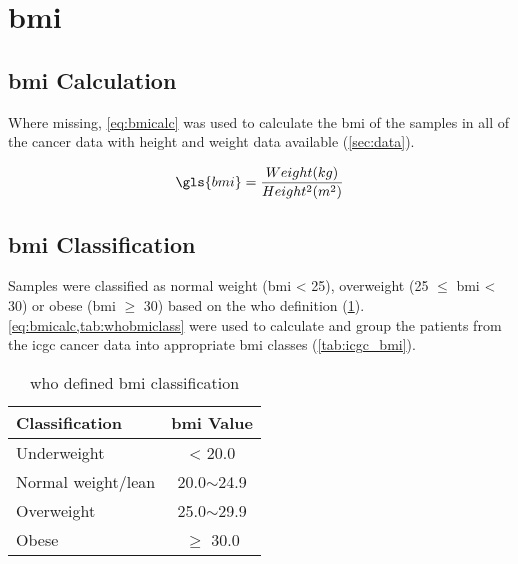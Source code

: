 \section{\Gls{bmi}}
\label{sec:bmi}

\subsection{\gls{bmi} Calculation}
\label{subsec:bmicalc}

Where missing, \cref{eq:bmicalc} was used to calculate the \gls{bmi} of the samples in all of the cancer data with height and weight data available (\cref{sec:data}).

\begin{equation}
	\label{eq:bmicalc}
	\gls{bmi} = \frac{Weight (kg)}{Height^2(m^2)}\\
\end{equation}

\subsection{\gls{bmi} Classification}
\label{subsec:bmiclassification}

Samples were classified as normal weight (\gls{bmi} \textless{} 25), overweight (25 $\leq$ \gls{bmi} \textless{} 30) or obese (\gls{bmi} $\geq$ 30) based on the \gls{who} definition (\cref{tab:whobmiclass}).
\cref{eq:bmicalc,tab:whobmiclass} were used to calculate and group the patients from the \gls{icgc} cancer data into appropriate \gls{bmi} classes (\cref{tab:icgc_bmi}).

\begin{table}[htb]
	\caption{\gls{who} defined \gls{bmi} classification}
	\label{tab:whobmiclass}
	\begin{center}
		\begin{tabular}{lc}
			Classification & \gls{bmi} Value\\
			\hline
			\rule{0pt}{2.25ex}Underweight & \textless{} 20.0\\
			Normal weight/lean & 20.0$\sim$24.9\\
			Overweight & 25.0$\sim$29.9\\
			Obese & $\geq{}$ 30.0\\
			\hline
			\hline
		\end{tabular}
	\end{center}
\end{table}

